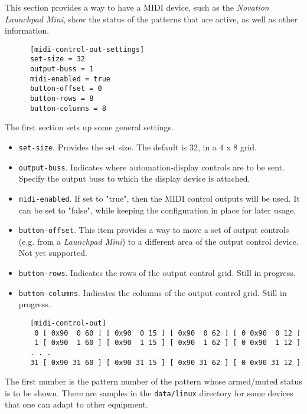    This section provides a way to have a MIDI device, such as the
   \textsl{Novation Launchpad Mini}, show the status
   of the patterns that are active, as well as other information.

   \begin{verbatim}
      [midi-control-out-settings]
      set-size = 32
      output-buss = 1
      midi-enabled = true
      button-offset = 0
      button-rows = 8
      button-columns = 8
   \end{verbatim}

   The first section sets up some general settings.

   \begin{itemize}
      \item \texttt{set-size}.
         Provides the set size.  The default is 32, in a 4 x 8 grid.
      \item \texttt{output-buss}.
         Indicates where automation-display controls are to be sent.
         Specify the output buss to which the display device is attached.
      \item \texttt{midi-enabled}.
         If set to "true", then the MIDI control outputs will be used.
         It can be set to "false", while keeping the configuration in place
         for later usage.
      \item \texttt{button-offset}.
         This item provides a way to move a set of output controls (e.g. from a
         \textsl{Launchpad Mini}) to a different area of the output control
         device.  Not yet supported.
      \item \texttt{button-rows}.
         Indicates the rows of the output control grid.
         Still in progress.
      \item \texttt{button-columns}.
         Indicates the columns of the output control grid.
         Still in progress.
   \end{itemize}

   \begin{verbatim}
      [midi-control-out]
       0 [ 0x90  0 60 ] [ 0x90  0 15 ] [ 0x90  0 62 ] [ 0 0x90  0 12 ]
       1 [ 0x90  1 60 ] [ 0x90  1 15 ] [ 0x90  1 62 ] [ 0 0x90  1 12 ]
      . . .
      31 [ 0x90 31 60 ] [ 0x90 31 15 ] [ 0x90 31 62 ] [ 0 0x90 31 12 ]
   \end{verbatim}

   The first number is the pattern number of the pattern whose armed/muted
   status is to be shown.
   There are samples in the \texttt{data/linux} directory for some devices that
   one can adapt to other equipment.

